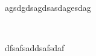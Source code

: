 

\begin{abstractslong}        %
agsdgdsagdsasdagesdag
\end{abstractslong}
\newpage
\ 


 \begin{abstractsgreeklong}
{\gr dfsafsaddsafsdaf}
 \end{abstractsgreeklong}

\newpage
\ 




